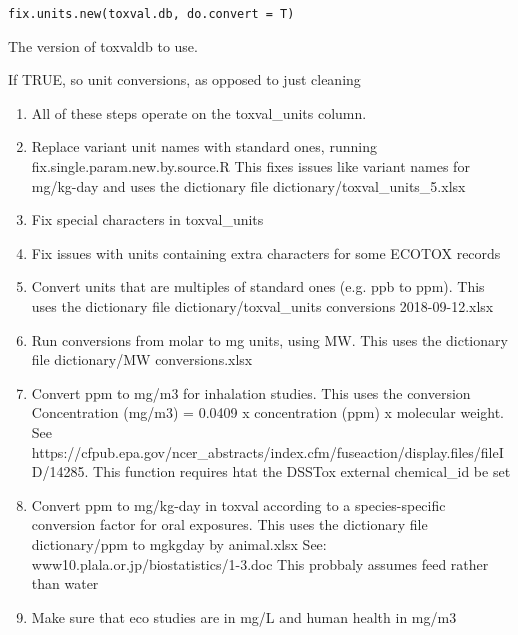 \documentclass[letterpaper]{book}
\begin{document}
%
\begin{Usage}
\begin{verbatim}
fix.units.new(toxval.db, do.convert = T)
\end{verbatim}
\end{Usage}
%
\begin{Arguments}
\begin{ldescription}
\item[\code{toxval.db}] The version of toxvaldb to use.

\item[\code{do.convert}] If TRUE, so unit conversions, as opposed to just cleaning
\end{ldescription}
\end{Arguments}
%
\begin{Description}\relax
\begin{enumerate}

\item{} All of these steps operate on the toxval\_units column.
\item{} Replace variant unit names with standard ones, running fix.single.param.new.by.source.R
This fixes issues like variant names for mg/kg-day and uses the dictionary
file dictionary/toxval\_units\_5.xlsx
\item{} Fix special characters in toxval\_units
\item{} Fix issues with units containing extra characters for some ECOTOX records
\item{} Convert units that are multiples of standard ones (e.g. ppb to ppm). This
uses the dictionary file dictionary/toxval\_units conversions 2018-09-12.xlsx
\item{} Run conversions from molar to mg units, using MW. This uses the dictionary file
dictionary/MW conversions.xlsx
\item{} Convert ppm to mg/m3 for inhalation studies. This uses the conversion Concentration
(mg/m3) = 0.0409 x concentration (ppm) x molecular weight. See
https://cfpub.epa.gov/ncer\_abstracts/index.cfm/fuseaction/display.files/fileID/14285.
This function requires htat the DSSTox external chemical\_id be set
\item{} Convert ppm to mg/kg-day in toxval according to a species-specific
conversion factor for oral exposures. This uses the dictionary file
dictionary/ppm to mgkgday by animal.xlsx
See: www10.plala.or.jp/biostatistics/1-3.doc
This probbaly assumes feed rather than water
\item{} Make sure that eco studies are in mg/L and human health in mg/m3

\end{enumerate}

\end{Description}
\end{document}
